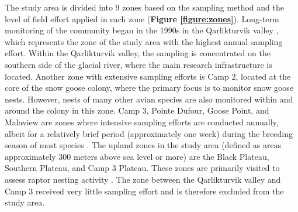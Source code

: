 \documentclass[a4paper,twoside,10pt]{article}
\begin{document}
The study area is divided into 9 zones based on the sampling method and the level of field effort applied in each zone (\textbf{Figure \ref{figure:zones}}). Long-term monitoring of the community began in the 1990s in the Qarlikturvik valley \citep{gauthier2013, gauthier2024a}, which represents the zone of the study area with the highest annual sampling effort. Within the Qarlikturvik valley, the sampling is concentrated on the southern side of the glacial river, where the main research infrastructure is located. Another zone with extensive sampling efforts is Camp 2, located at the core of the snow goose colony, where the primary focus is to monitor snow goose nests. However, nests of many other avian species are also monitored within and around the colony in this zone. Camp 3, Pointe Dufour, Goose Point, and Malaview are zones where intensive sampling efforts are conducted annually, albeit for a relatively brief period (approximately one week) during the breeding season of most species \citep{gauthier2024a}. The upland zones in the study area (defined as areas approximately 300 meters above sea level or more) are the Black Plateau, Southern Plateau, and Camp 3 Plateau. These zones are primarily visited to assess raptor nesting activity \citep{beardsell2016}. The zone between the Qarlikturvik valley and Camp 3 received very little sampling effort and is therefore excluded from the study area.
\end{document}

